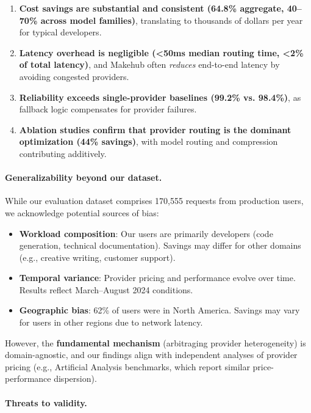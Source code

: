 \documentclass[english]{article}
\begin{document}
\begin{enumerate}
\item \textbf{Cost savings are substantial and consistent (64.8\% aggregate, 40--70\% across model families)}, translating to thousands of dollars per year for typical developers.

\item \textbf{Latency overhead is negligible (<50ms median routing time, <2\% of total latency)}, and Makehub often \emph{reduces} end-to-end latency by avoiding congested providers.

\item \textbf{Reliability exceeds single-provider baselines (99.2\% vs. 98.4\%)}, as fallback logic compensates for provider failures.

\item \textbf{Ablation studies confirm that provider routing is the dominant optimization (44\% savings)}, with model routing and compression contributing additively.
\end{enumerate}

\paragraph{Generalizability beyond our dataset.}

While our evaluation dataset comprises 170,555 requests from production users, we acknowledge potential sources of bias:
\begin{itemize}
    \item \textbf{Workload composition}: Our users are primarily developers (code generation, technical documentation). Savings may differ for other domains (e.g., creative writing, customer support).
    \item \textbf{Temporal variance}: Provider pricing and performance evolve over time. Results reflect March--August 2024 conditions.
    \item \textbf{Geographic bias}: 62\% of users were in North America. Savings may vary for users in other regions due to network latency.
\end{itemize}

However, the \textbf{fundamental mechanism} (arbitraging provider heterogeneity) is domain-agnostic, and our findings align with independent analyses of provider pricing (e.g., Artificial Analysis benchmarks, which report similar price-performance dispersion).

\paragraph{Threats to validity.}
\end{document}
